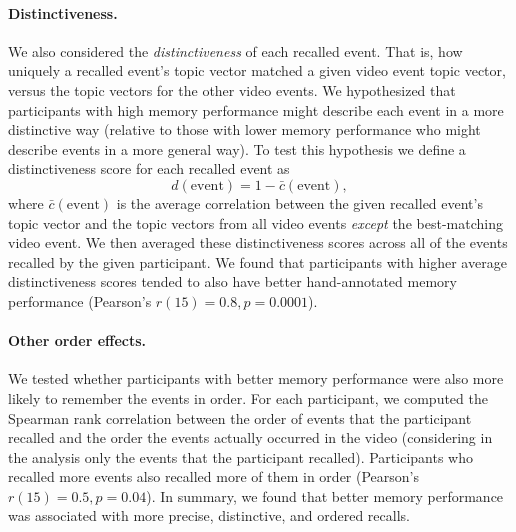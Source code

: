 \documentclass{article}
\begin{document}
\paragraph*{Distinctiveness.}
We also considered the \textit{distinctiveness} of each recalled event. That is, how uniquely a recalled event's topic vector matched a given video event topic vector, versus the topic vectors for the other video events. We hypothesized that participants with high memory performance might describe each event in a more distinctive way (relative to those with lower memory performance who might describe events in a more general way).  To test this hypothesis we define a distinctiveness score for each recalled event as
\[
  d(\mathrm{event}) = 1 - \bar{c}(\mathrm{event}),
\]
where $\bar{c}(\mathrm{event})$ is the average correlation between the given recalled event's topic vector and the topic vectors from all video events \textit{except} the best-matching video event.  We then averaged these distinctiveness scores across all of the events recalled by the given participant.  We found that participants with higher average distinctiveness scores tended to also have better hand-annotated memory performance (Pearson's $r(15) = 0.8, p = 0.0001$).

\paragraph*{Other order effects.}
We tested whether participants with better memory performance were also more likely to remember the events in order.  For each participant, we computed the Spearman rank correlation between the order of events that the participant recalled and the order the events actually occurred in the video (considering in the analysis only the events that the participant recalled).  Participants who recalled more events also recalled more of them in order (Pearson's $r(15) = 0.5, p = 0.04$). In summary, we found that better memory performance was associated with more precise, distinctive, and ordered recalls.





\end{document}
